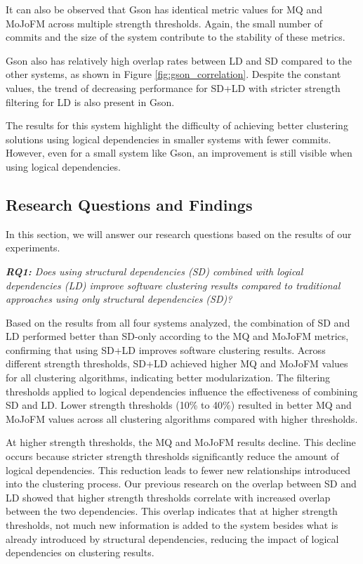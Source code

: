 \documentclass[12pt, a4paper, twoside]{report}
\begin{document}
It can also be observed that Gson has identical metric values for MQ and MoJoFM across multiple strength thresholds. Again, the small number of commits and the size of the system contribute to the stability of these metrics.

Gson also has relatively high overlap rates between LD and SD compared to the other systems, as shown in Figure \ref{fig:gson_correlation}. Despite the constant values, the trend of decreasing performance for SD+LD with stricter strength filtering for LD is also present in Gson.

The results for this system highlight the difficulty of achieving better clustering solutions using logical dependencies in smaller systems with fewer commits. However, even for a small system like Gson, an improvement is still visible when using logical dependencies.

\subsection{Research Questions and Findings}

In this section, we will answer our research questions based on the results of our experiments. 

\textit{ \textbf{RQ1:} Does using structural dependencies (SD) combined with logical dependencies (LD) improve software clustering results compared to traditional approaches using only structural dependencies (SD)?} 

Based on the results from all four systems analyzed, the combination of SD and LD performed better than SD-only according to the MQ and MoJoFM metrics, confirming that using SD+LD improves software clustering results. Across different strength thresholds, SD+LD achieved higher MQ and MoJoFM values for all clustering algorithms, indicating better modularization. 
The filtering thresholds applied to logical dependencies influence the effectiveness of combining SD and LD. Lower strength thresholds (10\% to 40\%) resulted in better MQ and MoJoFM values across all clustering algorithms compared with higher thresholds.

At higher strength thresholds, the MQ and MoJoFM results decline. This decline occurs because stricter strength thresholds significantly reduce the amount of logical dependencies. This reduction leads to fewer new relationships introduced into the clustering process. Our previous research on the overlap between SD and LD showed that higher strength thresholds correlate with increased overlap between the two dependencies. This overlap indicates that at higher strength thresholds, not much new information is added to the system besides what is already introduced by structural dependencies, reducing the impact of logical dependencies on clustering results.
\end{document}
